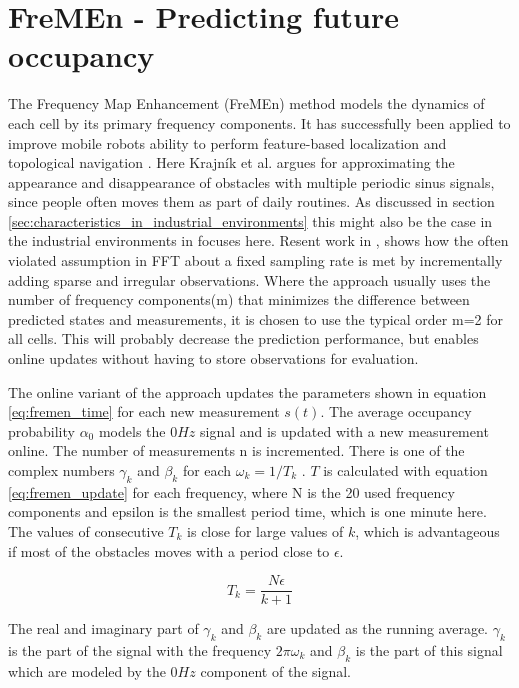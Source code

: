 \section{FreMEn - Predicting future occupancy}
\label{sec:fremen}
The  Frequency Map Enhancement (FreMEn) method models the dynamics of each cell by its primary frequency components. It has successfully been applied to improve mobile robots ability to perform feature-based localization \cite{online_fremen} and topological navigation \cite{fentanes2015}. Here Krajník et al. argues for approximating the appearance and disappearance of obstacles with multiple periodic sinus signals, since people often moves them as part of daily routines. As discussed in section \ref{sec:characteristics_in_industrial_environments} this might also be the case in the industrial environments in focuses here. Resent work in \cite{life_long_exploration}, shows how the often violated assumption in FFT about a fixed sampling rate is met by incrementally adding sparse and irregular observations. Where the approach usually uses the number of frequency components(m) that minimizes the difference between predicted states and measurements, it is chosen to use the typical order m=2 \cite{life_long_exploration} for all cells. This will probably decrease the prediction performance, but enables online updates without having to store observations for evaluation.

The online variant of the approach updates the parameters shown in equation \ref{eq:fremen_time} for each new measurement $s(t)$. 
The average occupancy probability $\alpha_0$ models the $0Hz$ signal and is updated with a new measurement online. 
The number of measurements n is incremented. There is one of the complex numbers $\gamma_k$ and $\beta_k$ for each $\omega_k=1/T_k$ . 
$T$ is calculated with equation \ref{eq:fremen_update} for each frequency, where N is the 20 used frequency components and epsilon is the smallest period time, which is one minute here. 
The values of consecutive $T_k$ is close for large values of $k$, which is advantageous if most of the obstacles moves with a period close to $\epsilon$.

\begin{equation}
    T_k = \frac{N \epsilon}{k+1}
    \label{eq:fremen_time}
\end{equation}

The real and imaginary part of $\gamma_k$ and $\beta_k$ are updated as the running average. $\gamma_k$ is the part of the signal with the frequency $2 \pi \omega_k$ and $\beta_k$ is the part of this signal which are modeled by the $0Hz$ component of the signal.

